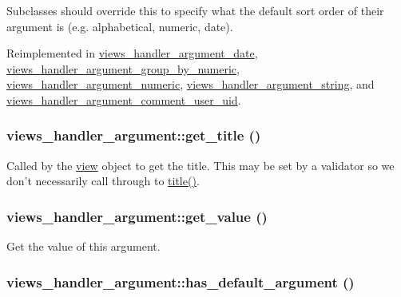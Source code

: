 Subclasses should override this to specify what the default sort order of their argument is (e.g. alphabetical, numeric, date). 

Reimplemented in \hyperlink{classviews__handler__argument__date_ab206fc9897b6b15df9b96ffb95c59cb5}{views\_\-handler\_\-argument\_\-date}, \hyperlink{classviews__handler__argument__group__by__numeric_aa0d331fb229f454fcc8e55d63b6a61fc}{views\_\-handler\_\-argument\_\-group\_\-by\_\-numeric}, \hyperlink{classviews__handler__argument__numeric_a6d3833ca6193a755babc3f47b68da495}{views\_\-handler\_\-argument\_\-numeric}, \hyperlink{classviews__handler__argument__string_a7f17c1b9687f36572d9dd2dee95002de}{views\_\-handler\_\-argument\_\-string}, and \hyperlink{classviews__handler__argument__comment__user__uid_a8f744e47fec12bc54c231f8a41a3447d}{views\_\-handler\_\-argument\_\-comment\_\-user\_\-uid}.\hypertarget{classviews__handler__argument_a45cf1f97b44753f32f6e4af75a4c881f}{
\subsubsection[{get\_\-title}]{\setlength{\rightskip}{0pt plus 5cm}views\_\-handler\_\-argument::get\_\-title ()}}
\label{classviews__handler__argument_a45cf1f97b44753f32f6e4af75a4c881f}
Called by the \hyperlink{classview}{view} object to get the title. This may be set by a validator so we don't necessarily call through to \hyperlink{classviews__handler__argument_a76181ac24e7be4a09aaafc1fa5f15ea1}{title()}. \hypertarget{classviews__handler__argument_a33540b3014b46e56646b03168468b981}{
\subsubsection[{get\_\-value}]{\setlength{\rightskip}{0pt plus 5cm}views\_\-handler\_\-argument::get\_\-value ()}}
\label{classviews__handler__argument_a33540b3014b46e56646b03168468b981}
Get the value of this argument. \hypertarget{classviews__handler__argument_abfc79c3b710372accd054b73bbb7b373}{
\subsubsection[{has\_\-default\_\-argument}]{\setlength{\rightskip}{0pt plus 5cm}views\_\-handler\_\-argument::has\_\-default\_\-argument ()}}
